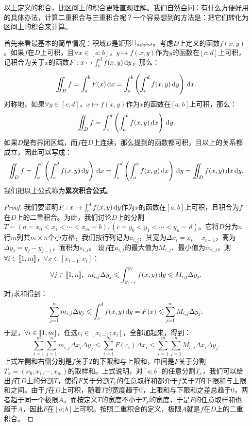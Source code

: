 \documentclass[12pt,UTF8,fontset=none]{ctexbook}
\begin{document}
以上定义的积合，比区间上的积合更难直观理解。我们自然会问：有什么方便好用的具体办法，计算二重积合与三重积合呢？一个容易想到的方法是：把它们转化为区间上的积合来计算。

首先来看最基本的简单情况：积域$D$是矩形$\rectbx_{a;b;c;d}$。考虑$D$上定义的函数$f(x,y)$。如果$f$在$D$上可积，且$\forall x\in[a;b]$，$y\mapsto f(x,y)$作为$y$的函数在$[c;d]$上可积，记积合为关于$x$的函数$F:x\mapsto \int_{c}^d f(x,y)\,\mathrm{d}y$，那么：
\begin{tm}
    $$ \int\!\!\!\!\!\int_{D} f = \int_{a}^b F(x)\,\mathrm{d}x = \int_{a}^b \left(\int_{c}^d f(x,y)\,\mathrm{d}y\right)\,\mathrm{d}x. $$
    对称地，如果$\forall y\in[c;d]$，$x\mapsto f(x,y)$作为$x$的函数在$[a;b]$上可积，那么：
    $$ \int\!\!\!\!\!\int_{D} f = \int_{c}^d \left(\int_{a}^b f(x,y)\,\mathrm{d}x\right)\,\mathrm{d}y. $$
    如果$D$是有界闭区域，而$f$在$D$上连续，那么提到的函数都可积，且以上的关系都成立，因此可以写成：
    $$ \jii_{D} f = \int_{a}^b \left(\int_{c}^d f(x,y)\di{y}\right)\di{x} = \int_{c}^d \left(\int_{a}^b f(x,y)\di{x}\right)\di{y} = \jii_{D} f(x,y) \di{x} \di{y}. $$
    我们把以上公式称为\textbf{累次积合公式}。
\end{tm}
\begin{proof}
    我们要证明$F:x\mapsto \int_{c}^d f(x,y)\,\mathrm{d}y$作为$x$的函数在$[a;b]$上可积，且积合为$f$在$D$上的二重积合。为此，我们讨论$D$上的分割$T=(a=x_0<x_1<\cdots<x_m=b),(c=y_0<y_1<\cdots<y_n=d)$。它将$D$分为$n$行$m$列共$m\times n$个小方格，我们按行列记为$a_{i,j}$，其宽为$\Delta x_i=x_i-x_{i-1}$，高为$\Delta y_j=y_j-y_{j-1}$，面积为$s_{i,j}$。  %
    设$f$在$a_{i,j}$的最大值为$M_{i,j}$、最小值为$m_{i,j}$，则$\forall i\in[\![1,m]\!]$，$\forall x\in[x_{i-1}; x_i]$：
    $$ \forall j\in[\![1,n]\!],\,\,\, m_{i,j} \Delta y_j \leqslant \int_{y_{j-1}}^{y_j} f(x, y)\,\mathrm{d}y\leqslant M_{i,j}\Delta y_j. $$
    对$j$求和得到：
    $$ \sum_{j=1}^n m_{i,j} \Delta y_j \leqslant \int_{c}^{d} f(x, y)\,\mathrm{d}y=F(x)\leqslant \sum_{j=1}^n  M_{i,j}\Delta y_j. $$
    于是，$\forall i\in[\![1,m]\!]$，任选$c_i\in[x_{i-1}; x_i]$，全部加起来，得到：
    $$ \sum_{i=1}^m\sum_{j=1}^n m_{i,j} \Delta x_i\Delta y_j \leqslant \sum_{i=1}^m F(c_i) \Delta x_i \leqslant \sum_{i=1}^m\sum_{j=1}^n  M_{i,j}\Delta x_i\Delta y_j. $$
    上式左侧和右侧分别是$f$关于$T$的下限和与上限和，中间是$F$关于分割$T_x=(x_0,x_1,\cdots,x_m)$的取样和。上式说明，对$[a;b]$的任意分割$T_x$，我们可以给出$f$在$D$上的分割$T$，使得$F$关于分割$T_x$的任意取样和都介于$f$关于$T$的下限和与上限和之间。由于$f$在$D$上可积，随着$T$的宽度趋于$0$，上限和与下限和之差总趋于$0$，两者趋于同一个极限$A$。而按定义$T$的宽度不小于$T_x$的宽度，于是$F$的任意取样和也趋于$A$，因此$F$在$[a;b]$上可积。按照二重积合的定义，极限$A$就是$f$在$D$上的二重积合。
\end{proof}
\end{document}
